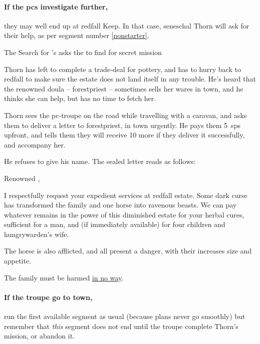 \paragraph{If the \glspl{pc} investigate further,}
they may well end up at \gls{redfall} Keep.
In that case, \gls{seneschal} Thorn will ask for their help, as per \gls{segment} number \vref{nonstarter}.

{The Search for }%
{'s  asks the  to find  for secret mission}%
\label{nonstarter}

\begin{exampletext}
  Thorn has left to complete a trade-deal for pottery, and has to hurry back to \gls{redfall} to make sure the estate does not land itself in any trouble.
  He's heard that the renowned \gls{doula} -- \gls{forestpriest} -- sometimes sells her wares in \gls{town}, and he thinks she can help, but has no time to fetch her.
\end{exampletext}

Thorn sees the \gls{pc}-troupe on the road while travelling with a caravan, and asks them to deliver a letter to \gls{forestpriest}, in \gls{town} urgently.
He pays them 5~\glspl{sp} upfront, and tells them they will receive 10 more if they deliver it successfully, and accompany her.

He refuses to give his name.
The sealed letter reads as follows:

\null
\begin{speechtext}
  Renowned ,

  I respectfully request your expedient services at \gls{redfall} estate.
  Some dark curse has transformed the family and one horse into ravenous beasts.
  We can pay whatever remains in the power of this diminished estate for your herbal cures, sufficient for a man, and (if immediately available) for four children and \gls{hungrywarden}'s wife.

  The horse is also afflicted, and all present a danger, with their increases size and appetite.

  The family must be harmed \underline{in no way}.
\end{speechtext}

\thornSeneschal

\label{thorn}

\paragraph{If the troupe go to \gls{town},}
run the first available \gls{segment} as usual (because plans never go smoothly) but remember that \emph{this} \gls{segment} does not end until the troupe complete Thorn's mission, or abandon it.

